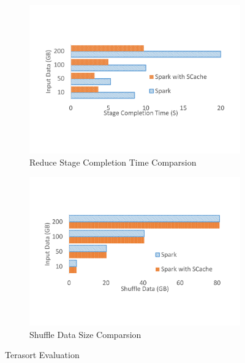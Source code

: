 

\begin{figure}
\begin{subfigure}{\linewidth}
	\includegraphics[width=\linewidth]{fig/tera}
	\caption{Reduce Stage Completion Time Comparsion}
	\label{fig:terasort}
\end{subfigure}
\begin{subfigure}{\linewidth}
	\includegraphics[width=\linewidth]{fig/tera_shuffle}
	\caption{Shuffle Data Size Comparsion}
	\label{fig:terashuffle}
\end{subfigure}
\caption{Terasort Evaluation}
\end{figure}

